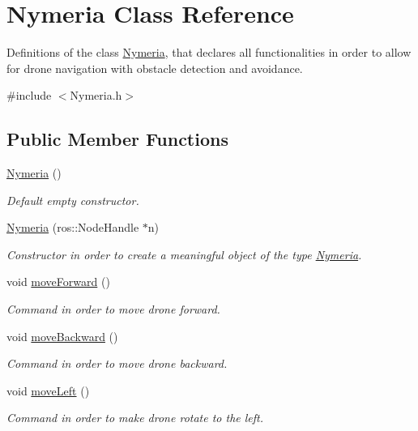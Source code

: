 \hypertarget{class_nymeria}{}\section{Nymeria Class Reference}
\label{class_nymeria}


Definitions of the class \hyperlink{class_nymeria}{Nymeria}, that declares all functionalities in order to allow for drone navigation with obstacle detection and avoidance.  




{\ttfamily \#include $<$Nymeria.\+h$>$}

\subsection*{Public Member Functions}
\begin{DoxyCompactItemize}
\item 
\hyperlink{class_nymeria_acee38ea6f62c9b81a6ec1a2c253456b9}{Nymeria} ()
\begin{DoxyCompactList}\small\item\em Default empty constructor. \end{DoxyCompactList}\item 
\hyperlink{class_nymeria_adaf1ee7808196815ff68489ddeb9b16d}{Nymeria} (ros\+::\+Node\+Handle $\ast$n)
\begin{DoxyCompactList}\small\item\em Constructor in order to create a meaningful object of the type \hyperlink{class_nymeria}{Nymeria}. \end{DoxyCompactList}\item 
void \hyperlink{class_nymeria_a3b35e3472b5335e3cb167fd9f7d28e57}{move\+Forward} ()
\begin{DoxyCompactList}\small\item\em Command in order to move drone forward. \end{DoxyCompactList}\item 
void \hyperlink{class_nymeria_a7781b8726f7a471265f86cd922440b12}{move\+Backward} ()
\begin{DoxyCompactList}\small\item\em Command in order to move drone backward. \end{DoxyCompactList}\item 
void \hyperlink{class_nymeria_a95e1a46cb702df4244a3058de3c19812}{move\+Left} ()
\begin{DoxyCompactList}\small\item\em Command in order to make drone rotate to the left. \end{DoxyCompactList}\item 

\end{DoxyCompactItemize}
